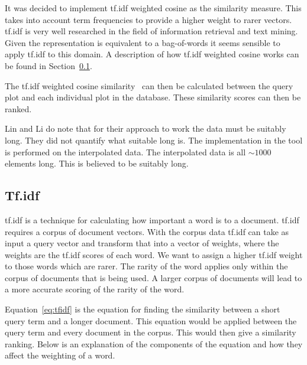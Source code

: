 It was decided to implement \ac{tf.idf} weighted cosine as the similarity measure.  This takes into account term frequencies to provide a higher weight to rarer vectors.  \ac{tf.idf} is very well researched in the field of information retrieval and text mining.  Given the representation is equivalent to a bag-of-words it seems sensible to apply \ac{tf.idf} to this domain.  A description of how \ac{tf.idf} weighted cosine works can be found in Section~\ref{sec:tfidf}.

The tf.idf weighted cosine similarity~\cite[p.~243]{se_book} can then be calculated between the query plot and each individual plot in the database.  These similarity scores can then be ranked.

Lin and Li do note that for their approach to work the data must be suitably long.  They did not quantify what suitable long is.  The implementation in the tool is performed on the interpolated data.  The interpolated data is all $\sim1000$ elements long.  This is believed to be suitably long.

\subsection{Tf.idf}
\label{sec:tfidf}

\ac{tf.idf} is a technique for calculating how important a word is to a document.  \ac{tf.idf} requires a corpus of document vectors.  With the corpus data \ac{tf.idf} can take as input a query vector and transform that into a vector of weights, where the weights are the \ac{tf.idf} scores of each word.  We want to assign a higher \ac{tf.idf} weight to those words which are rarer.  The rarity of the word applies only within the corpus of documents that is being used.  A larger corpus of documents will lead to a more accurate scoring of the rarity of the word.

Equation~\ref{eq:tfidf} is the equation for finding the similarity between a short query term and a longer document.  This equation would be applied between the query term and every document in the corpus.  This would then give a similarity ranking.  Below is an explanation of the components of the equation and how they affect the weighting of a word.

